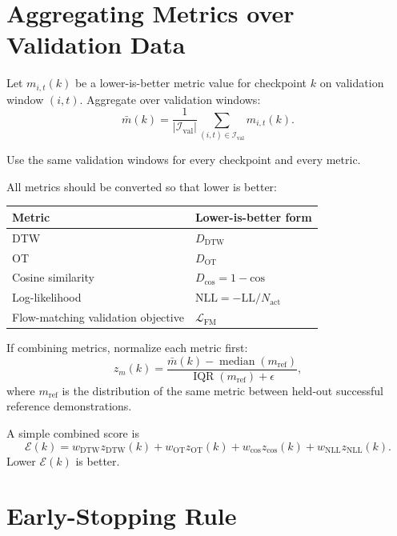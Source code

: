 \documentclass[11pt]{article}
\begin{document}
\section{Aggregating Metrics over Validation Data}

Let $m_{i,t}(k)$ be a lower-is-better metric value for checkpoint $k$ on validation window $(i,t)$. Aggregate over validation windows:
\begin{equation}
\bar{m}(k)
=
\frac{1}{|\mathcal{I}_{\mathrm{val}}|}
\sum_{(i,t)\in\mathcal{I}_{\mathrm{val}}}m_{i,t}(k).
\end{equation}

Use the same validation windows for every checkpoint and every metric.

All metrics should be converted so that lower is better:
\begin{center}
\begin{tabular}{ll}
\toprule
Metric & Lower-is-better form \\
\midrule
DTW & $D_{\mathrm{DTW}}$ \\
OT & $D_{\mathrm{OT}}$ \\
Cosine similarity & $D_{\mathrm{cos}}=1-\mathrm{cos}$ \\
Log-likelihood & $\mathrm{NLL}=-\mathrm{LL}/N_{\mathrm{act}}$ \\
Flow-matching validation objective & $\mathcal{L}_{\mathrm{FM}}$ \\
\bottomrule
\end{tabular}
\end{center}

If combining metrics, normalize each metric first:
\begin{equation}
z_m(k)=
\frac{\bar{m}(k)-\operatorname{median}(m_{\mathrm{ref}})}
{\operatorname{IQR}(m_{\mathrm{ref}})+\epsilon},
\end{equation}
where $m_{\mathrm{ref}}$ is the distribution of the same metric between held-out successful reference demonstrations.

A simple combined score is
\begin{equation}
\mathcal{E}(k)
=
 w_{\mathrm{DTW}}z_{\mathrm{DTW}}(k)
+w_{\mathrm{OT}}z_{\mathrm{OT}}(k)
+w_{\mathrm{cos}}z_{\mathrm{cos}}(k)
+w_{\mathrm{NLL}}z_{\mathrm{NLL}}(k).
\end{equation}
Lower $\mathcal{E}(k)$ is better.

\section{Early-Stopping Rule}
\end{document}
